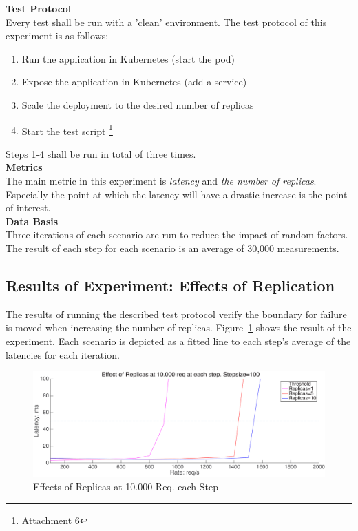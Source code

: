 \noindent\textbf{Test Protocol}\\
Every test shall be run with a 'clean' environment. The test protocol of this experiment is as follows:

\vspace{-3mm}
\begin{enumerate}
  \setlength\itemsep{0.05em}
  \item Run the application in Kubernetes (start the pod)
  \item Expose the application in Kubernetes (add a service)
  \item Scale the deployment to the desired number of replicas
  \item Start the test script \footnote{Attachment 6}
\end{enumerate}

\noindent
Steps 1-4 shall be run in total of three times.\\


\noindent\textbf{Metrics}\\
The main metric in this experiment is \textit{latency} and \textit{the number of replicas}. Especially the point at which the latency will have a drastic increase is the point of interest. \\

\noindent\textbf{Data Basis}\\
Three iterations of each scenario are run to reduce the impact of random factors. The result of each step for each scenario is an average of 30,000 measurements.

\subsection*{Results of Experiment: Effects of Replication}

The results of running the described test protocol verify the boundary for failure is moved when increasing the number of replicas. Figure~\ref{fig:rep_effect} shows the result of the experiment. Each scenario is depicted as a fitted line to each step's average of the latencies for each iteration. 

\begin{figure}[H]
\centering
\includegraphics[width=\textwidth]{figures/effect_of_replicas_at_10000req_each_step}
\caption{Effects of Replicas at 10.000 Req. each Step}
\label{fig:rep_effect}
\end{figure}

